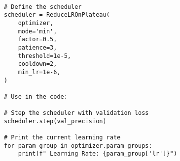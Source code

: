 \newcommand{\vertline}{\textbar} %
\newcommand{\cornerline}{\rule{1.5ex}{0.4pt}} %
\newcommand{\branch}{\textbar\cornerline} %




\EN
\begin{tcolorbox}[colframe=black, colback=gray!5, boxrule=0.5mm, sharp corners]

\begin{verbatim}

# Define the scheduler
scheduler = ReduceLROnPlateau(
    optimizer,
    mode='min',
    factor=0.5,
    patience=3,
    threshold=1e-5,
    cooldown=2,
    min_lr=1e-6,
)

# Use in the code:

# Step the scheduler with validation loss
scheduler.step(val_precision)

# Print the current learning rate
for param_group in optimizer.param_groups:
    print(f" Learning Rate: {param_group['lr']}")
\end{verbatim}
\end{tcolorbox}

\newpage
\HE
{}
\clearpage



\HE